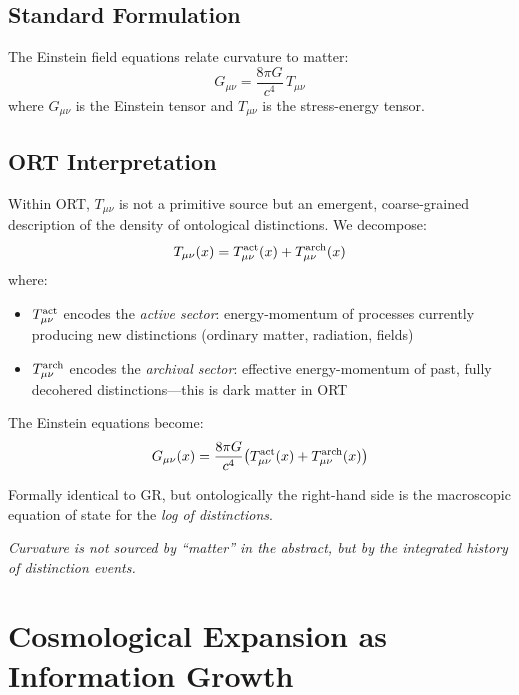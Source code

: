 \documentclass[12pt,a4paper]{article}
\begin{document}
\subsection{Standard Formulation}

The Einstein field equations relate curvature to matter:
\begin{equation}
    G_{\mu\nu} = \frac{8\pi G}{c^4}\,T_{\mu\nu}
\end{equation}
where $G_{\mu\nu}$ is the Einstein tensor and $T_{\mu\nu}$ is the stress-energy tensor.

\subsection{ORT Interpretation}

Within ORT, $T_{\mu\nu}$ is not a primitive source but an emergent, coarse-grained description of the density of ontological distinctions. We decompose:
\begin{equation}
    T_{\mu\nu}(x) = T_{\mu\nu}^{\rm act}(x) + T_{\mu\nu}^{\rm arch}(x)
\end{equation}
where:
\begin{itemize}
    \item $T_{\mu\nu}^{\rm act}$ encodes the \emph{active sector}: energy-momentum of processes currently producing new distinctions (ordinary matter, radiation, fields)
    \item $T_{\mu\nu}^{\rm arch}$ encodes the \emph{archival sector}: effective energy-momentum of past, fully decohered distinctions---this is dark matter in ORT
\end{itemize}

The Einstein equations become:
\begin{equation}
    G_{\mu\nu}(x) = \frac{8\pi G}{c^4}\bigl(T_{\mu\nu}^{\rm act}(x) + T_{\mu\nu}^{\rm arch}(x)\bigr)
\end{equation}

Formally identical to GR, but ontologically the right-hand side is the macroscopic equation of state for the \emph{log of distinctions}.

\begin{center}
\emph{Curvature is not sourced by ``matter'' in the abstract, but by the integrated history of distinction events.}
\end{center}

\section{Cosmological Expansion as Information Growth}
\end{document}
